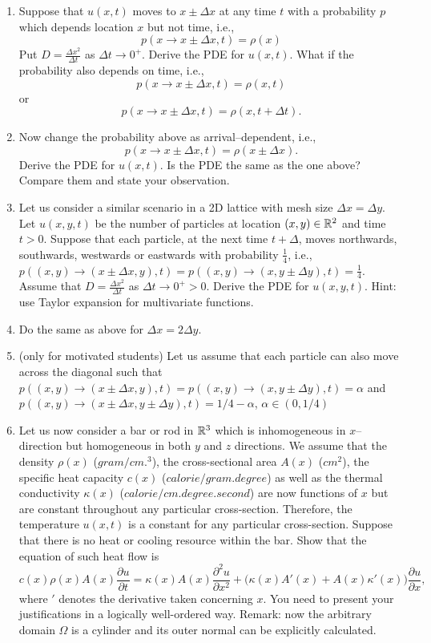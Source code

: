 \documentclass[6pt]{article}
\numberwithin{equation}{section}
\def\mathbb{\Bbb}
\begin{document}
\begin{enumerate}
\item Suppose that $u(x,t)$ moves to $x\pm\Delta x$  at any time $t$ with a probability $p$ which depends location $x$ but not time, i.e.,
\[p(x\rightarrow x\pm\Delta x,t)=\rho(x)\]
Put $D=\frac{\Delta x^2}{\Delta t}$ as $\Delta t \rightarrow 0^+$.  Derive the PDE for $u(x,t)$.  What if the probability also depends on time, i.e.,
\[p(x\rightarrow x\pm\Delta x,t)=\rho(x,t)\]
or
\[p(x\rightarrow x\pm\Delta x,t)=\rho(x,t+\Delta t).\]


\item  Now change the probability above as arrival--dependent, i.e.,
\[p(x\rightarrow x\pm\Delta x,t)=\rho(x\pm\Delta x).\]
Derive the PDE for $u(x,t)$.  Is the PDE the same as the one above?  Compare them and state your observation.

\item Let us consider a similar scenario in a 2D lattice with mesh size $\Delta x=\Delta y$.  Let $u(x,y,t)$ be the number of particles at location $(x,y)\in \mathbb{R}^2$ and time $t>0$.  Suppose that each particle, at the next time $t+\Delta$, moves northwards, southwards, westwards or eastwards with probability $\frac{1}{4}$, i.e., $p((x,y)\rightarrow (x\pm\Delta x,y),t)=p((x,y)\rightarrow (x,y\pm\Delta y),t)=\frac{1}{4}$.  Assume that $D=\frac{\Delta x^2}{\Delta t}$ as $\Delta t \rightarrow 0^+>0$.  Derive the PDE for $u(x,y,t)$.  Hint: use Taylor expansion for multivariate functions.

\item Do the same as above for $\Delta x=2\Delta y$.

\item (only for motivated students) Let us assume that each particle can also move across the diagonal such that $p((x,y)\rightarrow (x\pm\Delta x,y),t)=p((x,y)\rightarrow (x,y\pm\Delta y),t)=\alpha$ and $p((x,y)\rightarrow (x\pm\Delta x,y\pm\Delta y),t)=1/4-\alpha$, $\alpha\in(0,1/4)$

\item  Let us now consider a bar or rod in $\mathbb R^3$ which is inhomogeneous in $x$--direction but homogeneous in both $y$ and $z$ directions.  We assume that the density $\rho(x)$ ($gram/cm.^3$), the cross-sectional area $A(x)$ ($cm^2$), the specific heat capacity $c(x)$ ($calorie/gram.degree $) as well as the thermal conductivity $\kappa(x)$ ($calorie/cm. degree. second$) are now functions of $x$ but are constant throughout any particular cross-section.  Therefore, the temperature $u(x,t)$ is a constant for any particular cross-section.  Suppose that there is no heat or cooling resource within the bar.  Show that the equation of such heat flow is
\begin{equation}\label{1}
c(x)\rho(x)A(x)\frac{\partial u}{\partial t}=\kappa(x)A(x)\frac{\partial^2 u}{\partial x^2}+\Big(\kappa(x)A'(x)+A(x)\kappa'(x) \Big)\frac{\partial u}{\partial x},
\end{equation}
where $'$ denotes the derivative taken concerning $x$.  You need to present your justifications in a logically well-ordered way.  Remark: now the arbitrary domain $\Omega$ is a cylinder and its outer normal can be explicitly calculated.


\end{enumerate}
\end{document}
